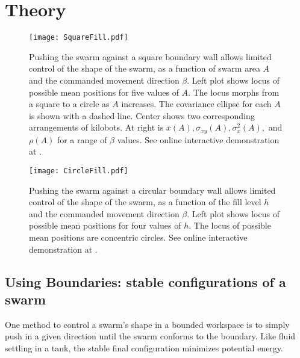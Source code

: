 \section{Theory}
\label{sec:theory}
\begin{figure*}[!htb]
\begin{center}
\texttt{[image: SquareFill.pdf]} 
\vspace{-1em}
\caption{Pushing the swarm against a square boundary wall allows limited control of the shape of the swarm, as a function of swarm area $A$ and the commanded movement direction $\beta$. Left plot shows locus of possible mean positions for five values of $A$.  The locus morphs from a square to a circle as $A$ increases.  The covariance ellipse for each $A$ is shown with a dashed line. Center shows two corresponding arrangements of kilobots.  At right is $\bar{x}(A), \sigma_{xy}(A), \sigma_x^2(A),$ and $\rho(A)$ for a range of $\beta$ values. See online interactive demonstration at \citep{Zhao2016mathematicaSquare}.}
\label{fig:SquareFill}
\end{center}
\end{figure*} 
\begin{figure*}[!htb]
\begin{center}
\vspace{-1em}
\texttt{[image: CircleFill.pdf]} 
\vspace{-1em}
\caption{Pushing the swarm against a circular boundary wall allows limited control of the shape of the swarm, as a function of the fill level $h$ and the commanded movement direction $\beta$. Left plot shows locus of possible mean positions for four values of $h$. The locus of possible mean positions are concentric circles. See online interactive demonstration at \citep{Zhao2016mathematica}.}  
\label{fig:CircleFill}
\end{center}
\vspace{-1em}
\end{figure*} 

\subsection{Using Boundaries: stable configurations of a swarm}\label{subsec:FluidInTank}
One method to control a swarm's shape in a bounded workspace is to simply push in a given direction until the swarm conforms to the boundary. Like fluid settling in a tank, the stable final configuration minimizes potential energy.
